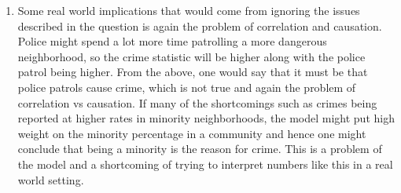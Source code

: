 \documentclass[12pt]{article}
\theoremstyle{definitionstyle}
\begin{document}
\begin{enumerate}[label=\alph*.]
        \item Some real world implications that would come from ignoring the issues described in the question is again the problem of correlation and causation. Police might spend a lot more time patrolling a more dangerous neighborhood, so the crime statistic will be higher along with the police patrol being higher. From the above, one would say that it must be that police patrols cause crime, which is not true and again the problem of correlation vs causation. If many of the shortcomings such as crimes being reported at higher rates in minority neighborhoods, the model might put high weight on the minority percentage in a community and hence one might conclude that being a minority is the reason for crime. This is a problem of the model and a shortcoming of trying to interpret numbers like this in a real world setting. 
    \end{enumerate}

    \newpage
\end{document}
